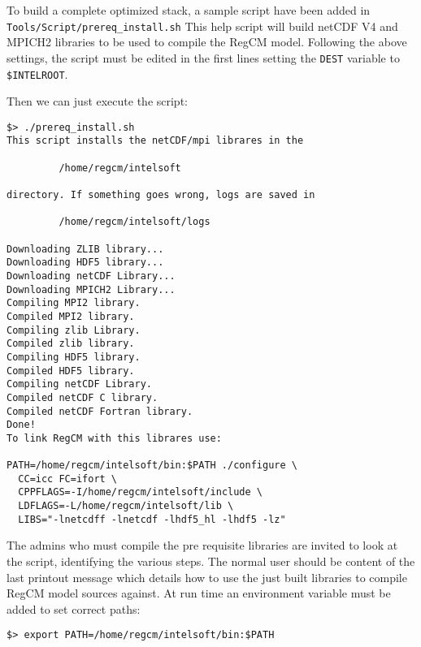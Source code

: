 To build a complete optimized stack, a sample script have been added
in \verb=Tools/Script/prereq_install.sh=
This help script will build netCDF V4 and MPICH2 libraries to be used to
compile the RegCM model.
Following the above settings, the script must be edited in the first lines
setting the \verb=DEST= variable to \verb=$INTELROOT=.

Then we can just execute the script:

\begin{Verbatim}
$> ./prereq_install.sh
This script installs the netCDF/mpi librares in the

         /home/regcm/intelsoft

directory. If something goes wrong, logs are saved in

         /home/regcm/intelsoft/logs

Downloading ZLIB library...
Downloading HDF5 library...
Downloading netCDF Library...
Downloading MPICH2 Library...
Compiling MPI2 library.
Compiled MPI2 library.
Compiling zlib Library.
Compiled zlib library.
Compiling HDF5 library.
Compiled HDF5 library.
Compiling netCDF Library.
Compiled netCDF C library.
Compiled netCDF Fortran library.
Done!
To link RegCM with this librares use:

PATH=/home/regcm/intelsoft/bin:$PATH ./configure \
  CC=icc FC=ifort \
  CPPFLAGS=-I/home/regcm/intelsoft/include \
  LDFLAGS=-L/home/regcm/intelsoft/lib \
  LIBS="-lnetcdff -lnetcdf -lhdf5_hl -lhdf5 -lz"

\end{Verbatim}

The admins who must compile the pre requisite libraries are invited to look
at the script, identifying the various steps.
The normal user should be content of the last printout message which details
how to use the just built libraries to compile RegCM model sources against.
At run time an environment variable must be added to set correct paths:

\begin{Verbatim}
$> export PATH=/home/regcm/intelsoft/bin:$PATH
\end{Verbatim}
